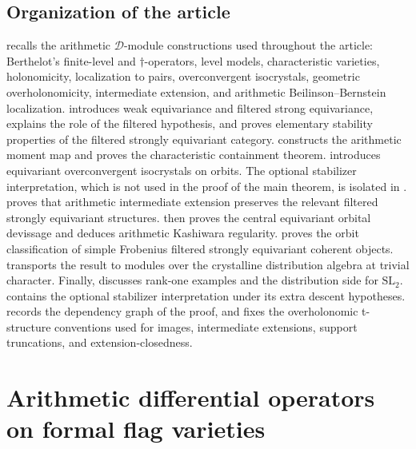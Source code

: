 \documentclass[11pt]{amsart}
\theoremstyle{plain}
\theoremstyle{definition}
\theoremstyle{remark}
\begin{document}
\subsection*{Organization of the article}

 recalls the arithmetic \(\mathscr D\)-module
constructions used throughout the article: Berthelot's finite-level and
\(\dagger\)-operators, level models, characteristic varieties, holonomicity,
localization to pairs, overconvergent isocrystals, geometric overholonomicity,
intermediate extension, and arithmetic Beilinson--Bernstein localization.
 introduces weak equivariance and filtered strong equivariance,
explains the role of the filtered hypothesis, and proves elementary stability
properties of the filtered strongly equivariant category.
 constructs the arithmetic moment map and proves the
characteristic containment theorem.   introduces
equivariant overconvergent isocrystals on orbits.  The optional stabilizer
interpretation, which is not used in the proof of the main theorem, is isolated
in .   proves
that arithmetic intermediate extension preserves the relevant filtered strongly equivariant structures.  
then proves the central equivariant orbital devissage and deduces arithmetic
Kashiwara regularity.   proves the orbit
classification of simple Frobenius filtered strongly equivariant coherent objects.
 transports the result to modules over the crystalline
distribution algebra at trivial character.  Finally, 
discusses rank-one examples and the distribution side for \(\mathrm{SL}_2\).
 contains the optional stabilizer interpretation under its extra descent hypotheses.   records the dependency graph of the proof, and  fixes the overholonomic t-structure conventions used for images, intermediate extensions, support truncations, and extension-closedness.

\section{Arithmetic differential operators on formal flag varieties}
\label{sec:preliminaries}
\end{document}
